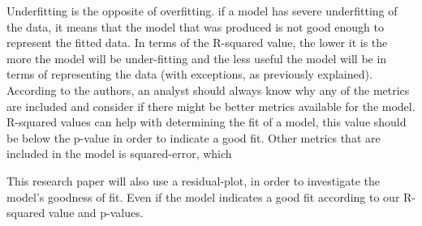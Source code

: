 \documentclass[12pt]{article}
\begin{document}

Underfitting is the opposite of overfitting. if a model has severe underfitting of the data, it  means that the model that was produced is not good enough to represent the fitted data.  In terms of the R-squared value, the lower it is the more the model will be under-fitting and the less useful the model will be in terms of representing the data (with exceptions, as previously explained). \\


According to the authors, an analyst should always know why any of the metrics are included and consider if there might be better metrics available for the model.
R-squared values can help with determining the fit of a model, this value should be below the p-value in order to indicate a good fit. Other metrics that are included in the model is squared-error, which 

This research paper will also use a residual-plot, in order to investigate the model's goodness of fit. Even if the model indicates a good fit according to our R-squared value and p-values. 





\end{document}
